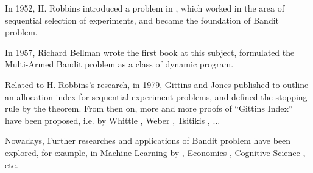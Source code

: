 In 1952, H. Robbins introduced a problem in \cite{robbins1952bandit}, which worked in the area of sequential selection of experiments, and became the foundation of Bandit problem. 

In 1957, Richard Bellman wrote the first book\cite{bellman1957markovian} at this subject, formulated the Multi-Armed Bandit problem as a class of dynamic program. 


Related to H. Robbins's research, in 1979, Gittins and Jones published \cite{gittins1979dynamic} to outline an allocation index for sequential experiment problems, and defined the stopping rule by the theorem. From then on, more and more proofs of ``Gittins Index'' have been proposed, i.e. by Whittle \cite{whittle1980multi},  Weber \cite{weber1992gittins}, Tsitikis \cite{tsitsiklis1994short}, $\dots$

Nowadays, Further researches and applications of Bandit problem have been explored,  for example, in Machine Learning by  \cite{Berry85Bandit, kaelbling1996reinforcement,Sutton98}, Economics \cite{anderson2001behavioral,banks1997experimental,steyvers2009bayesian} , Cognitive Science  \cite{daw2006cortical}, etc.

\
\
\
\
\
\









